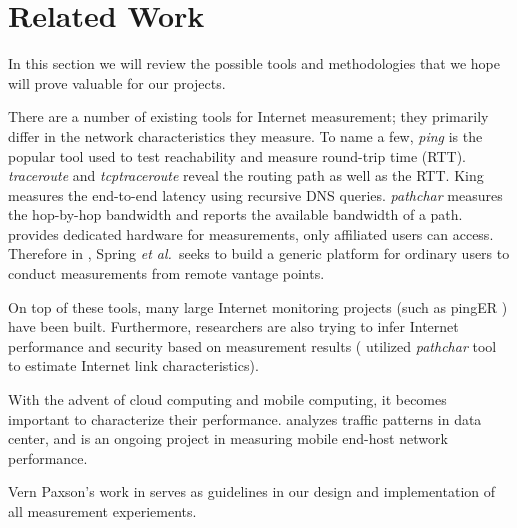 \section{Related Work}
\label{sec:related-work}


In this section we will review the possible tools and methodologies that we hope will prove valuable for our projects.

There are a number of existing tools for Internet measurement; they primarily differ in the network characteristics they measure. To name a few, {\em ping} is the popular tool used to test reachability and measure round-trip time (RTT). {\em traceroute} \cite{jacobson1989traceroute} and {\em tcptraceroute} \cite{toren2001tcptraceroute} reveal the routing path as well as the RTT. King \cite{gummadi2002king} measures the end-to-end latency using recursive DNS queries. {\em pathchar} \cite{jacobson1997pathchar} measures the hop-by-hop bandwidth and \cite{jain2002pathload} reports the available bandwidth of a path. \cite{paxson2002experiences} provides dedicated hardware for measurements, only affiliated  users can access. Therefore in \cite{spring2003scriptroute}, Spring {\em et al.}\, seeks to build a generic platform for ordinary users to conduct measurements from remote vantage points.

On top of these tools, many large Internet monitoring projects (such as pingER \cite{matthews2000pinger}) have been built. Furthermore, researchers are also trying to infer Internet performance and security \cite{paxson1999bro} based on measurement results (\cite{downey1999using} utilized {\em pathchar} tool to estimate Internet link characteristics).

With the advent of cloud computing and mobile computing, it becomes important to characterize their performance. \cite{kandula2009nature, benson2010network} analyzes traffic patterns in data center, and \cite{huang2011mobiperf} is an ongoing project in measuring mobile end-host network performance.

Vern Paxson's work in \cite{paxson1997measurements, paxson1997end, paxson2004strategies} serves as guidelines in our design and implementation of all measurement experiements.

